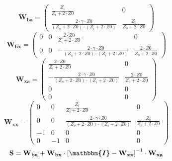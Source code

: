 \[ \mathbf{W_{ba}} = \left(\begin{smallmatrix} \frac{Z_i}{Z_i+2\cdot
Z0} & 0 \\ \frac{2\cdot \gamma\cdot Z0}{\left(Z_o+2\cdot
Z0\right)\cdot\left(Z_i+2\cdot Z0\right)} & \frac{Z_o}{Z_o+2\cdot Z0}
\end{smallmatrix}\right) \]
\[ \mathbf{W_{bx}} = \left(\begin{smallmatrix} 0 & 0 & \frac{2\cdot
Z0}{Z_i+2\cdot Z0} & 0 \\ 0 & 0 & -\frac{2\cdot \gamma\cdot
Z0}{\left(Z_o+2\cdot Z0\right)\cdot\left(Z_i+2\cdot Z0\right)} &
\frac{2\cdot Z0}{Z_o+2\cdot Z0} \end{smallmatrix}\right) \]
\[ \mathbf{W_{xa}} = \left(\begin{smallmatrix} \frac{2\cdot
Z0}{Z_i+2\cdot Z0} & 0 \\ -\frac{2\cdot \gamma\cdot
Z0}{\left(Z_o+2\cdot Z0\right)\cdot\left(Z_i+2\cdot Z0\right)} &
\frac{2\cdot Z0}{Z_o+2\cdot Z0} \\ 0 & 0 \\ 0 & 0
\end{smallmatrix}\right) \]
\[ \mathbf{W_{xx}} = \left(\begin{smallmatrix} 0 & 0 &
\frac{Z_i}{Z_i+2\cdot Z0} & 0 \\ 0 & 0 & \frac{2\cdot \gamma\cdot
Z0}{\left(Z_o+2\cdot Z0\right)\cdot\left(Z_i+2\cdot Z0\right)} &
\frac{Z_o}{Z_o+2\cdot Z0} \\ -1 & 0 & 0 & 0 \\ 0 & -1 & 0 & 0
\end{smallmatrix}\right) \]
\[ \mathbf{S}=\mathbf{W_{ba}}+\mathbf{W_{bx}}\cdot\left[
\boldsymbol{\mathbbm{I}}
-\mathbf{W_{xx}}\right]^{-1}\cdot\mathbf{W_{xa}} \]
